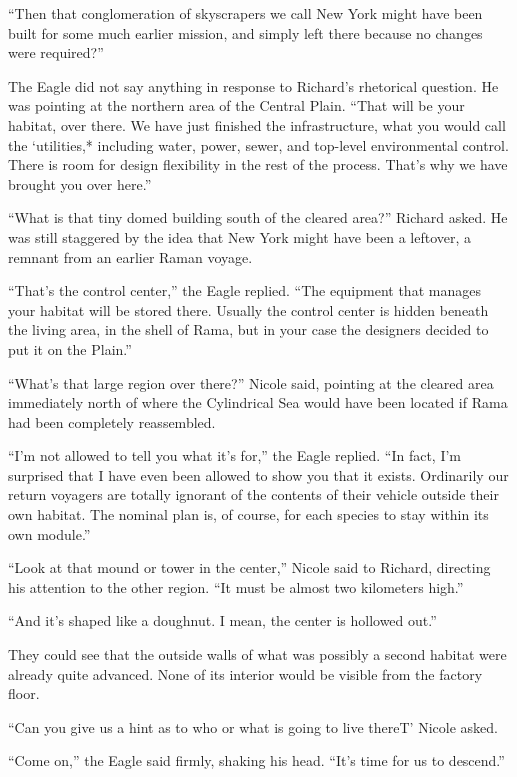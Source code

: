\documentclass[]{article}
\begin{document}
{“Then that conglomeration of skyscrapers we call New York might have been built for some much earlier mission, and simply left there because no changes were required?”

The Eagle did not say anything in response to Richard’s rhetorical question.  He was pointing at the northern area of the Central Plain.  “That will be your habitat, over there.  We have just finished the infrastructure, what you would call the ‘utilities,* including water, power, sewer, and top-level environmental control.  There is room for design flexibility in the rest of the process.  That’s why we have brought you over here.”

“What is that tiny domed building south of the cleared area?” Richard asked.  He was still staggered by the idea that New York might have been a leftover, a remnant from an earlier Raman voyage.

“That’s the control center,” the Eagle replied.  “The equipment that manages your habitat will be stored there.  Usually the control center is hidden beneath the living area, in the shell of Rama, but in your case the designers decided to put it on the Plain.”

“What’s that large region over there?” Nicole said, pointing at the cleared area immediately north of where the Cylindrical Sea would have been located if Rama had been completely reassembled.

“I’m not allowed to tell you what it’s for,” the Eagle replied.  “In fact, I’m surprised that I have even been allowed to show you that it exists.  Ordinarily our return voyagers are totally ignorant of the contents of their vehicle outside their own habitat.  The nominal plan is, of course, for each species to stay within its own module.”

“Look at that mound or tower in the center,” Nicole said to Richard, directing his attention to the other region.  “It must be almost two kilometers high.”

“And it’s shaped like a doughnut.  I mean, the center is hollowed out.”

They could see that the outside walls of what was possibly a second habitat were already quite advanced.  None of its interior would be visible from the factory floor.

“Can you give us a hint as to who or what is going to live thereT’ Nicole asked.

“Come on,” the Eagle said firmly, shaking his head.  “It’s time for us to descend.”

}
\end{document}
